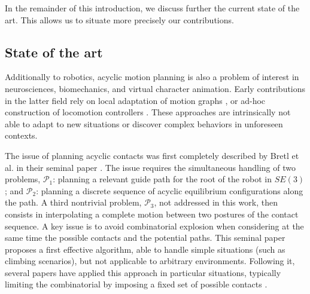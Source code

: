In the remainder of this introduction, we discuss further the current state of the art. This allows us to situate more precisely our contributions.

\subsection{State of the art}

\newcommand{\Pa}{$\mathcal{P}_1$ }
\newcommand{\Pb}{$\mathcal{P}_2$ }

Additionally to robotics, acyclic motion planning is also a problem of interest in neurosciences, biomechanics, and virtual character animation.
Early contributions in the latter field rely on local adaptation of motion graphs \citep{citeulike:220163}, or ad-hoc construction of locomotion controllers \citep{Pettre:2003:LPD:846276.846313}. These approaches are intrinsically not able to adapt to new situations or discover complex behaviors in unforeseen contexts.

The issue of planning acyclic contacts was first completely described by Bretl et al. in their seminal paper  \citep{Bretl:2006:MPM:1124573.1124585}. The issue requires the simultaneous handling of two problems, $\mathcal{P}_1$: planning a relevant guide path for the root of the robot in $SE(3)$; and $\mathcal{P}_2$: planning a discrete sequence of acyclic equilibrium configurations along the path. A third nontrivial problem, $\mathcal{P}_3$, not addressed in this work, then consists in interpolating a complete motion between two postures of the contact sequence.  A key issue is to avoid combinatorial explosion when considering at the same time the possible contacts and the potential paths. This seminal paper proposes a first effective algorithm, able to handle simple situations (such as climbing scenarios), but not applicable to arbitrary environments. Following it, seve\-ral papers have applied this approach in particular situations, typically limiting the combinatorial by imposing a fixed set of possible contacts \citep{Hauser06usingmotion, stilman2010}.


